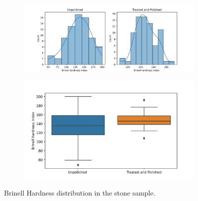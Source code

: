 \documentclass[12pt,a4paper]{style}
\begin{document}
	\begin{figure}
		\centering
		\begin{subfigure}[t]{0.55\textwidth}
			\includegraphics[width=\textwidth]{stone_hardness_distribution.png}
			\caption{}
			\label{fig:stones-dist}
		\end{subfigure}
		\begin{subfigure}[t]{0.4\textwidth}
			\includegraphics[width=\textwidth]{stone_hardness.png}
			\caption{}
			\label{fig:stones-box}
		\end{subfigure}
		\caption{Brinell Hardness distribution in the stone sample.}
		\label{fig:Zingaro-stones}
	\end{figure}
	
\end{document}
